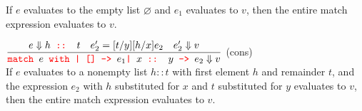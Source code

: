 \begin{Def}
\begin{itemize}
            \noindent
            If $e$ evaluates to the empty list $\varnothing$ and $e_1$ evaluates to $v$, then the entire match expression evaluates to $v$.

        \LARGE 
            $\dfrac{e \Downarrow h \texttt{\color{red}{ :: }} t \quad e'_2 = [t/y][h/x]e_2 \quad e'_2 \Downarrow v}
            {\texttt{\color{red}{match }} e \texttt{\color{red}{ with | [] -> }} e_1 \texttt{\color{red}{| }} x \texttt{\color{red}{ :: }} y \texttt{\color{red}{ -> }} e_2 \Downarrow v}$ (cons) \normalsize\\
            
            \noindent
            If $e$ evaluates to a nonempty list $h::t$ with first element $h$ and remainder $t$, and the expression $e_2$ with $h$ substituted for $x$ and $t$ substituted for $y$ evaluates to $v$, then the entire match expression evaluates to $v$.
       
    \end{itemize}
\end{Def}

\newpage

